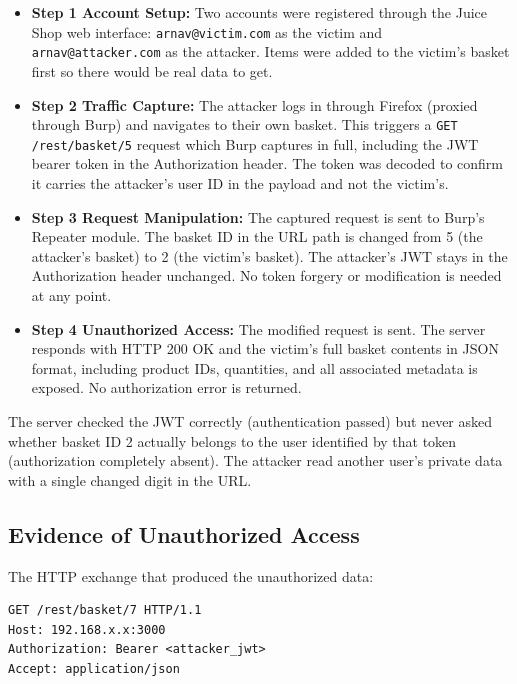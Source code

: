 \documentclass[12pt]{IEEEtran}
\begin{document}
\begin{itemize}
  \item \textbf{Step 1 Account Setup:} Two accounts were registered through the Juice Shop web interface: \texttt{arnav@victim.com} as the victim and \texttt{arnav@attacker.com} as the attacker. Items were added to the victim's basket first so there would be real data to get.

  \item \textbf{Step 2 Traffic Capture:} The attacker logs in through Firefox (proxied through Burp) and navigates to their own basket. This triggers a \texttt{GET /rest/basket/5} request which Burp captures in full, including the JWT bearer token in the Authorization header. The token was decoded to confirm it carries the attacker's user ID in the payload and not the victim's.

  \item \textbf{Step 3 Request Manipulation:} The captured request is sent to Burp's Repeater module. The basket ID in the URL path is changed from 5 (the attacker's basket) to 2 (the victim's basket). The attacker's JWT stays in the Authorization header unchanged. No token forgery or modification is needed at any point.

  \item \textbf{Step 4 Unauthorized Access:} The modified request is sent. The server responds with HTTP 200 OK and the victim's full basket contents in JSON format, including product IDs, quantities, and all associated metadata is exposed. No authorization error is returned.
\end{itemize}

The server checked the JWT correctly (authentication passed) but never asked whether basket ID 2 actually belongs to the user identified by that token (authorization completely absent). The attacker read another user's private data with a single changed digit in the URL.

\subsection{Evidence of Unauthorized Access}

The HTTP exchange that produced the unauthorized data:

\begin{verbatim}
GET /rest/basket/7 HTTP/1.1
Host: 192.168.x.x:3000
Authorization: Bearer <attacker_jwt>
Accept: application/json
\end{verbatim}
\end{document}
